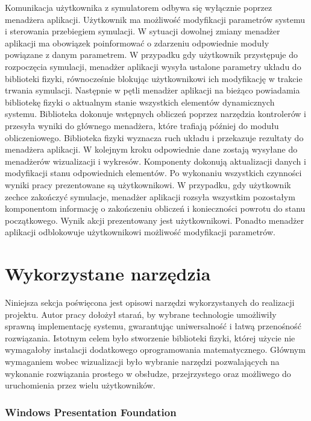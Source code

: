 \documentclass[12pt, twoside, openany]{report}
\theoremstyle{definition}
\begin{document}
Komunikacja użytkownika z symulatorem odbywa się wyłącznie poprzez menadżera aplikacji. Użytkownik ma możliwość modyfikacji parametrów systemu i sterowania przebiegiem symulacji. W sytuacji dowolnej zmiany menadżer aplikacji ma obowiązek poinformować o zdarzeniu odpowiednie moduły powiązane z danym parametrem. W przypadku gdy użytkownik przystępuje do rozpoczęcia symulacji, menadżer aplikacji wysyła ustalone parametry układu do biblioteki fizyki, równocześnie blokując użytkownikowi ich modyfikację w trakcie trwania symulacji. Następnie w pętli menadżer aplikacji na bieżąco powiadamia bibliotekę fizyki o aktualnym stanie wszystkich elementów dynamicznych systemu. Biblioteka dokonuje wstępnych obliczeń poprzez narzędzia kontrolerów i przesyła wyniki do głównego menadżera, które trafiają później do modułu obliczeniowego. Biblioteka fizyki wyznacza ruch układu i przekazuje rezultaty do menadżera aplikacji. W kolejnym kroku odpowiednie dane zostają wysyłane do menadżerów wizualizacji i wykresów. Komponenty dokonują aktualizacji danych i modyfikacji stanu odpowiednich elementów. Po wykonaniu wszystkich czynności wyniki pracy prezentowane są użytkownikowi. W przypadku, gdy użytkownik zechce zakończyć symulacje, menadżer aplikacji rozsyła wszystkim pozostałym komponentom informację o zakończeniu obliczeń i konieczności powrotu do stanu początkowego. Wynik akcji prezentowany jest użytkownikowi. Ponadto menadżer aplikacji odblokowuje użytkownikowi możliwość modyfikacji parametrów.

\section{Wykorzystane narzędzia}
\label{Tools}
Niniejsza sekcja poświęcona jest opisowi narzędzi wykorzystanych do realizacji projektu. Autor pracy dołożył starań, by wybrane technologie umożliwiły sprawną implementację systemu, gwarantując uniwersalność i łatwą przenośność rozwiązania. Istotnym  celem było stworzenie biblioteki fizyki, której użycie nie wymagałoby instalacji dodatkowego oprogramowania matematycznego. Głównym wymaganiem wobec wizualizacji było wybranie narzędzi pozwalających na wykonanie rozwiązania prostego w obsłudze, przejrzystego oraz możliwego do uruchomienia przez wielu użytkowników.

\subsubsection{Windows Presentation Foundation}
\end{document}

